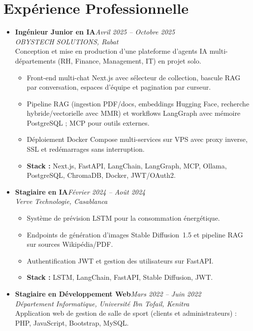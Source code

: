 \documentclass[10pt,a4paper]{article}
\newcommand{\role}[2]{\textbf{#1}\hfill\textit{\color{muted}#2}\\}
\newcommand{\org}[1]{\textit{#1}\\[0.5pt]}
\begin{document}
\section*{Expérience Professionnelle}
\begin{itemize}
    \item \role{Ingénieur Junior en IA}{Avril 2025 -- Octobre 2025}
          \org{OBYSTECH SOLUTIONS, Rabat}
          Conception et mise en production d'une plateforme d'agents IA multi-départements (RH, Finance, Management, IT) en projet solo.
          \begin{itemize}
              \item Front-end multi-chat Next.js avec sélecteur de collection, bascule RAG par conversation, espaces d'équipe et pagination par curseur.
              \item Pipeline RAG (ingestion PDF/docs, embeddings Hugging Face, recherche hybride/vectorielle avec MMR) et workflows LangGraph avec mémoire PostgreSQL ; MCP pour outils externes.
              \item Déploiement Docker Compose multi-services sur VPS avec proxy inverse, SSL et redémarrages sans interruption.
              \item \textbf{Stack :} Next.js, FastAPI, LangChain, LangGraph, MCP, Ollama, PostgreSQL, ChromaDB, Docker, JWT/OAuth2.
          \end{itemize}

    \item \role{Stagiaire en IA}{Février 2024 -- Août 2024}
          \org{Verve Technologie, Casablanca}
          \begin{itemize}
              \item Système de prévision LSTM pour la consommation énergétique.
              \item Endpoints de génération d'images Stable Diffusion~1.5 et pipeline RAG sur sources Wikipédia/PDF.
              \item Authentification JWT et gestion des utilisateurs sur FastAPI.
              \item \textbf{Stack :} LSTM, LangChain, FastAPI, Stable Diffusion, JWT.
          \end{itemize}

    \item \role{Stagiaire en Développement Web}{Mars 2022 -- Juin 2022}
          \org{Département Informatique, Université Ibn Tofail, Kenitra}
          Application web de gestion de salle de sport (clients et administrateurs) : PHP, JavaScript, Bootstrap, MySQL.
\end{itemize}
\end{document}

